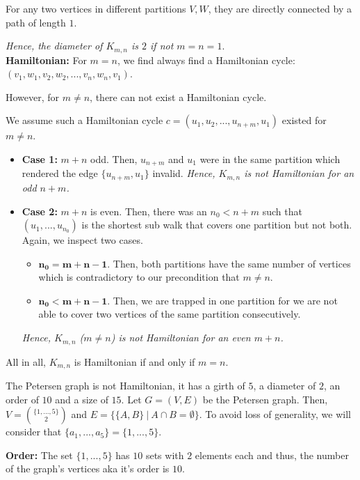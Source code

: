 \documentclass[a4paper]{article}
\begin{document}
\begin{solution}{9}
\begin{theorem}
				For any two vertices in different partitions $V, W$, they are directly connected by a path of length $1$.

				 \emph{Hence, the diameter of $K_{m,n}$ is $2$ if not $m = n = 1$}.\\

			\textbf{Hamiltonian:} For $m = n$, we find always find a Hamiltonian cycle: $(v_1, w_1, v_2, w_2, ..., v_n, w_n, v_1)$.

				However, for $m \neq n$, there can not exist a Hamiltonian cycle.

				We assume such a Hamiltonian cycle $c = (u_1, u_2, ..., u_{n+m}, u_1)$ existed for $m \neq n$. 
				\begin{itemize}
					\item \textbf{Case 1:} $m + n$ odd. Then, $u_{n+m}$ and $u_1$ were in the same partition which rendered the edge $\{u_{n+m}, u_1\}$ invalid. \emph{Hence, $K_{m,n}$ is not Hamiltonian for an odd $n + m$.}
					\item \textbf{Case 2:} $m + n$ is even. Then, there was an $n_0 < n+m$ such that $(u_1, ..., u_{n_0})$ is the shortest sub walk that covers one partition but not both. Again, we inspect two cases.
						\begin{itemize}
							\item $\mathbf{n_0 = m + n - 1}$. Then, both partitions have the same number of vertices which is contradictory to our precondition that $m \neq n$.
							\item $\mathbf{n_0 < m + n - 1}$. Then, we are trapped in one partition for we are not able to cover two vertices of the same partition consecutively.
						\end{itemize}
					\emph{Hence, $K_{m, n}$ ($m \neq n$) is not Hamiltonian for an even $m + n$.}
				\end{itemize}

				All in all, $K_{m,n}$ is Hamiltonian if and only if $m = n$.
		\end{theorem}
			
		\newpage
		\begin{theorem}{The Petersen graph is not Hamiltonian, it has a girth of $5$, a diameter of $2$, an order of $10$ and a size of $15$.}
			Let $G = (V, E)$ be the Petersen graph. Then, $V = \binom{\{1, ..., 5\}}{2}$ and $E = \{\{A, B\}\ |\ A \cap B = \emptyset\}$. To avoid loss of generality, we will consider that $\{a_1, ..., a_5\} = \{1, ..., 5\}$.
			
			\textbf{Order:} The set $\{1, ..., 5\}$ has $10$ sets with $2$ elements each and thus, the number of the graph's vertices aka it's order is $10$.\\
			

\end{theorem}
\end{solution}
\end{document}
